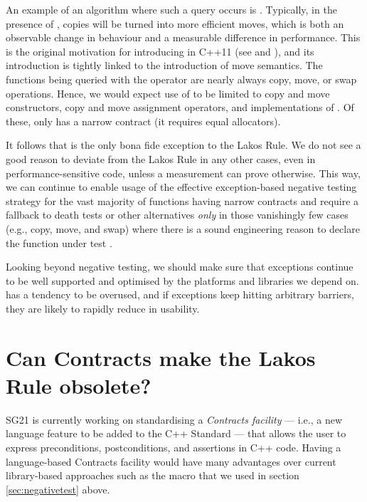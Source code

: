 An example of an algorithm where such a query occurs is . Typically, in the presence of , copies will be turned into more efficient moves, which is both an observable change in behaviour and a measurable difference in performance. This is the original motivation for introducing  in C++11 (see \cite{N2855} and \cite{N3050}), and its introduction is tightly linked to the introduction of move semantics. The functions being queried with the  operator are nearly always copy, move, or swap operations. Hence, we would expect use of  to be limited to copy and move constructors, copy and move assignment operators, and implementations of . Of these, only  has a narrow contract (it requires equal allocators).

It follows that  is the only bona fide exception to the Lakos Rule. We do not see a good reason to deviate from the Lakos Rule in any other cases, even in performance-sensitive code, unless a measurement can prove otherwise. This way, we can continue to enable usage of the effective exception-based negative testing strategy for the vast majority of functions having narrow contracts and require a fallback to death tests or other alternatives \emph{only} in those vanishingly few cases (e.g., copy, move, and swap) where there is a sound engineering reason to declare the function under test .

Looking beyond negative testing, we should make sure that exceptions continue to be well supported and optimised by the platforms and libraries we depend on.  has a tendency to be overused, and if exceptions keep hitting arbitrary  barriers, they are likely to rapidly reduce in usability. 

\section{Can Contracts make the Lakos Rule obsolete?}
\label{sec:contracts}

SG21 is currently working on standardising a \emph{Contracts facility} --- i.e., a new language feature to be added to the C++ Standard --- that allows the user to express preconditions, postconditions, and assertions in C++ code. Having a language-based Contracts facility would have many advantages over current library-based approaches such as the  macro that we used in section \ref{sec:negativetest} above.

